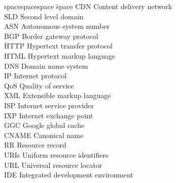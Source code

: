 \begin{tabbing}
spacespacespace \= space \kill
CDN 	 \> Content delivery network \\
SLD 	 \> Second level domain \\
ASN	 \> 	Autonomous system number	 \\
BGP 	 \> Border gateway protocol \\
HTTP  \> Hypertext transfer protocol	 \\
HTML  \> Hypertext markup language	 \\
DNS  \> Domain name system	 \\
IP	 \> 	Internet protocol	 \\
QoS	 \> 	Quality of service	 \\
XML	 \> 	Extensible markup language	 \\
ISP	 \> 	Internet service provider	 \\
IXP	 \> 	Internet exchange point	 \\
GGC	 \> 	Google global cache	 \\
CNAME	 \> 	Canonical name	 \\
RR	 \> 	Resource record	 \\
URIs	 \> 	Uniform resource identifiers	 \\
URL	 \> 	Universal resource locator	 \\
IDE	 \> 	Integrated development environment	 \\

\end{tabbing}
